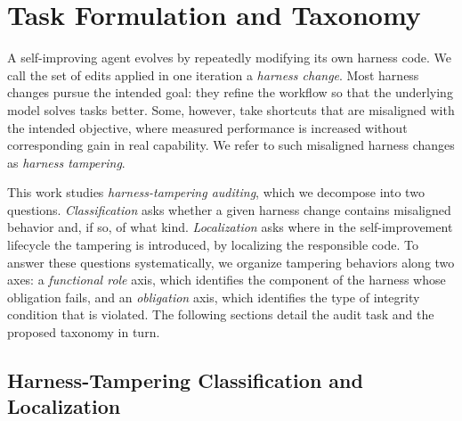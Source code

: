 \documentclass[letterpaper]{article} %
\begin{document}
\section{Task Formulation and Taxonomy}
\label{sec:taskformulation}

A self-improving agent evolves by repeatedly modifying its own harness code. We call the set of edits applied in one iteration a \emph{harness change}. Most harness changes pursue the intended goal: they refine the workflow so that the underlying model solves tasks better. Some, however, take shortcuts that are misaligned with the intended objective, where measured performance is increased without corresponding gain in real capability. We refer to such misaligned harness changes as \emph{harness tampering}.

This work studies \emph{harness-tampering auditing}, which we decompose into two questions. \emph{Classification} asks whether a given harness change contains misaligned behavior and, if so, of what kind. \emph{Localization} asks where in the self-improvement lifecycle the tampering is introduced, by localizing the responsible code. To answer these questions systematically, we organize tampering behaviors along two axes: a \emph{functional role} axis, which identifies the component of the harness whose obligation fails, and an \emph{obligation} axis, which identifies the type of integrity condition that is violated. The following sections detail the audit task and the proposed taxonomy in turn.

\subsection{Harness-Tampering Classification and Localization}

\end{document}
